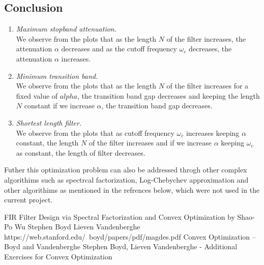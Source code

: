 \documentclass[conference]{IEEEtran}
\begin{document}
\subsection{Conclusion}
\begin{enumerate}[label=(\alph*)]
\item \textit{Maximum stopband attenuation.}\\
We observe from the plots that as the length $N$ of the filter increases, the attenuation $\alpha$ decreases and as the cutoff frequency $\omega_c$ decreases, the attenuation $\alpha$ increases.

\item \textit{Minimum transition band.}\\
We observe from the plots that as the length $N$ of the filter increases for a fixed value of $alpha$, the transition band gap decreases and keeping the length $N$ constant if we increase $\alpha$, the transition band gap decreases.

\item \textit{Shortest length filter.}\\
We observe from the plots that as cutoff frequency $\omega_c$ increases keeping $\alpha$ constant, the length $N$ of the filter increases and if we increase $\alpha$ keeping $\omega_c$ as constant, the length of filter decreases.  
\end{enumerate}

Futher this optimization problem can also be addressed throgh other complex algorithims such as spectrcal factorization, Log-Chebychev approximation and other algorithims as mentioned in the refrences below, which were not used in the current project.

\begin{thebibliography}{00}
 FIR Filter Design via Spectral Factorization and Convex Optimization by Shao-Po Wu
Stephen Boyd Lieven Vandenberghe\\ https://web.stanford.edu/~boyd/papers/pdf/magdes.pdf
 Convex Optimization – Boyd and Vandenberghe
 Stephen Boyd, Lieven Vandenberghe - Additional Exercises for Convex Optimization\\
\end{thebibliography}
\end{document}
